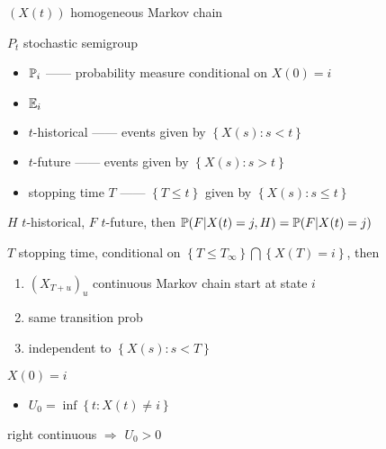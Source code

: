 \begin{setting}
    $(X(t))$ homogeneous Markov chain
\end{setting}

\begin{thm}
    $P_t$ stochastic semigroup
\end{thm}

\begin{itemize}
    \item $\mathbb{P}_i$ ------ probability measure conditional on $X(0) = i$
    \item $\mathbb{E}_i$
    \item $t$-historical ------ events given by $\left\{ X(s) : s < t \right\}$
    \item $t$-future ------ events given by $\left\{ X(s) : s > t \right\}$
    \item stopping time $T$ ------ $\left\{ T \leq t \right\}$ given by $\left\{ X(s) : s \leq t \right\}$
\end{itemize}

\begin{thm}
    $H$ $t$-historical, $F$ $t$-future, then $\mathbb{P}(F|X(t) = j, H) = \mathbb{P}(F | X(t) = j)$
\end{thm}

\begin{thm}
    $T$ stopping time, conditional on $\left\{ T \leq T_\infty \right\} \bigcap \left\{ X(T) = i \right\}$, then
    \begin{enumerate}
        \item $(X_{T + u})_u$ continuous Markov chain start at state $i$
        \item same transition prob
        \item independent to $\left\{ X(s) : s < T \right\}$
    \end{enumerate}
\end{thm}

\begin{setting}
    $X(0) = i$
\end{setting}

\begin{itemize}
    \item $U_0 = \inf \left\{ t : X(t) \neq i \right\}$
\end{itemize}

\begin{fact}
    right continuous $\Rightarrow$ $U_0 > 0$
\end{fact}

